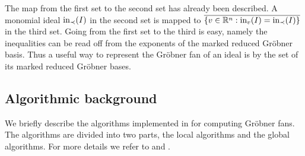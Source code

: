 The map from the first set to the second set has already been
described. A monomial ideal $\textup{in}_\prec(I)$ in the second set is
mapped to $\overline{\{v\in\mathbb{R}^n:\textup{in}_v(I)=\textup{in}_\prec(I)\}}$ in the
third set. Going from the first set to the third is easy, namely the
inequalities can be read off from the exponents of the marked reduced
Gr\"obner basis.
Thus a useful way to represent the
Gr\"obner fan of an ideal is by the set of its marked reduced Gr\"obner
bases.


\subsection{Algorithmic background}
We briefly describe the algorithms implemented in \name for computing Gr\"obner fans. The algorithms are divided into two parts, the local algorithms and the global algorithms. For more details we refer to \cite{fukuda} and \cite{symmetricfans}.
